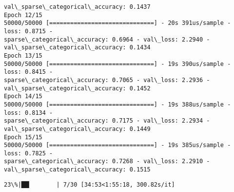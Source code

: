 \documentclass[11pt]{article}
\begin{document}
\begin{Verbatim}[commandchars=\\\{\}]
val\_sparse\_categorical\_accuracy: 0.1437
Epoch 12/15
50000/50000 [==============================] - 20s 391us/sample - loss: 0.8715 -
sparse\_categorical\_accuracy: 0.6964 - val\_loss: 2.2940 -
val\_sparse\_categorical\_accuracy: 0.1434
Epoch 13/15
50000/50000 [==============================] - 19s 390us/sample - loss: 0.8415 -
sparse\_categorical\_accuracy: 0.7065 - val\_loss: 2.2936 -
val\_sparse\_categorical\_accuracy: 0.1452
Epoch 14/15
50000/50000 [==============================] - 19s 388us/sample - loss: 0.8134 -
sparse\_categorical\_accuracy: 0.7175 - val\_loss: 2.2934 -
val\_sparse\_categorical\_accuracy: 0.1449
Epoch 15/15
50000/50000 [==============================] - 19s 385us/sample - loss: 0.7825 -
sparse\_categorical\_accuracy: 0.7268 - val\_loss: 2.2910 -
val\_sparse\_categorical\_accuracy: 0.1515
    \end{Verbatim}

    \begin{Verbatim}[commandchars=\\\{\}]
 23\%|██▎       | 7/30 [34:53<1:55:18, 300.82s/it]
    \end{Verbatim}
\end{document}
